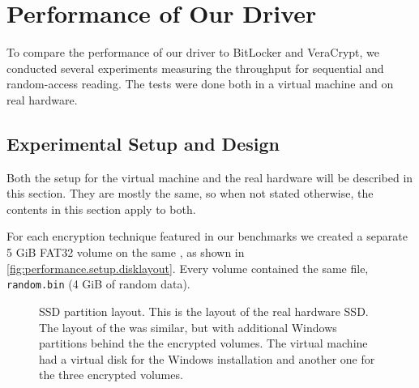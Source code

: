 \chapter{Performance of Our Driver}
\label{chap:performance}

To compare the performance of our driver to BitLocker and VeraCrypt, we conducted several experiments measuring the throughput for sequential and random-access reading. The tests were done both in a virtual machine and on real hardware.

\section{Experimental Setup and Design}
\label{chap:performance.setup}
Both the setup for the virtual machine and the real hardware will be described in this section. They are mostly the same, so when not stated otherwise, the contents in this section apply to both.

For each encryption technique featured in our benchmarks we created a separate 5 GiB FAT32 volume on the same , as shown in \autoref{fig:performance.setup.disklayout}. Every volume contained the same file, \texttt{random.bin} (4 GiB of random data). 

\begin{figure}[htb!]
	\caption[
		SSD partition layout
	]{
		SSD partition layout. This is the layout of the real hardware SSD. The layout of the  was similar, but with additional Windows partitions behind the the encrypted volumes. The virtual machine had a virtual disk for the Windows installation and another one for the three encrypted volumes.
	}
	\label{fig:performance.setup.disklayout}
\end{figure}

